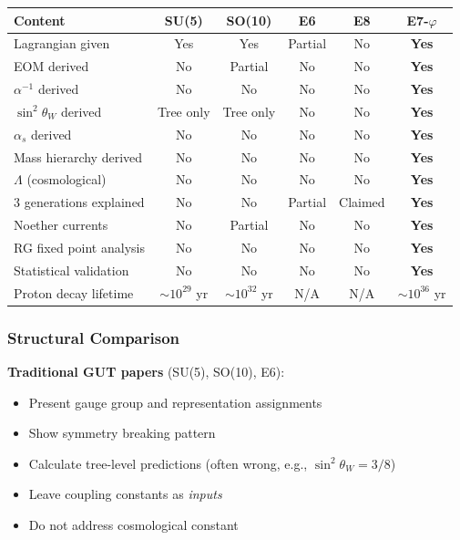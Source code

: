 \documentclass[11pt,a4paper]{article}
\begin{document}
\begin{center}
\begin{tabular}{|l|c|c|c|c|c|}
\hline
\textbf{Content} & \textbf{SU(5)} & \textbf{SO(10)} & \textbf{E6} & \textbf{E8} & \textbf{E7-$\varphi$} \\
\hline
Lagrangian given & Yes & Yes & Partial & No & \textbf{Yes} \\
EOM derived & No & Partial & No & No & \textbf{Yes} \\
$\alpha^{-1}$ derived & No & No & No & No & \textbf{Yes} \\
$\sin^2\theta_W$ derived & Tree only & Tree only & No & No & \textbf{Yes} \\
$\alpha_s$ derived & No & No & No & No & \textbf{Yes} \\
Mass hierarchy derived & No & No & No & No & \textbf{Yes} \\
$\Lambda$ (cosmological) & No & No & No & No & \textbf{Yes} \\
3 generations explained & No & No & Partial & Claimed & \textbf{Yes} \\
Noether currents & No & Partial & No & No & \textbf{Yes} \\
RG fixed point analysis & No & No & No & No & \textbf{Yes} \\
Statistical validation & No & No & No & No & \textbf{Yes} \\
Proton decay lifetime & $\sim 10^{29}$ yr & $\sim 10^{32}$ yr & N/A & N/A & $\sim 10^{36}$ yr \\
\hline
\end{tabular}
\end{center}

\subsubsection{Structural Comparison}

\textbf{Traditional GUT papers} (SU(5), SO(10), E6):
\begin{itemize}
\item Present gauge group and representation assignments
\item Show symmetry breaking pattern
\item Calculate tree-level predictions (often wrong, e.g., $\sin^2\theta_W = 3/8$)
\item Leave coupling constants as \textit{inputs}
\item Do not address cosmological constant
\end{itemize}
\end{document}
